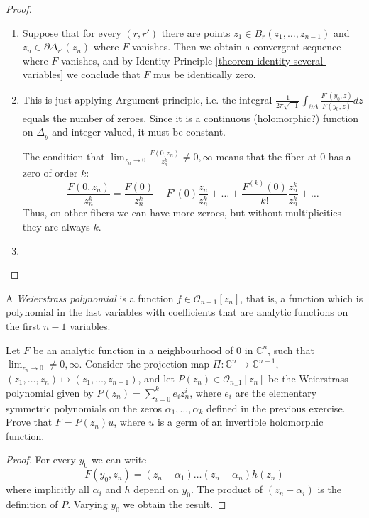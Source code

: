 \begin{proof}
\begin{enumerate}
\item Suppose that for every $(r,r')$ there are points 
$z_1\in B_r(z_1,\ldots,z_{n-1})$ and $z_n\in \partial\Delta_{r'}(z_n)$
where $F$ vanishes. Then we obtain a convergent sequence where $F$
vanishes, and by Identity Principle \ref{theorem-identity-several-variables} we
conclude that $F$ mus be identically zero.
\item This is just applying Argument principle, i.e. the integral 
$\frac{1}{2\pi\sqrt{-1}}\int_{\partial \Delta}\frac{F'(y_0,z)}{F(y_0,z)}dz$ 
equals the number of zeroes. Since it is a continuous (holomorphic?) function on
$\Delta_y$ and integer valued, it must be constant.

The condition that $\lim_{z_n\to0}\frac{F(0,z_n)}{z_n^k}\neq 0,\infty$ means
that the fiber at 0 has a zero of order $k$:
$$
\frac{F(0,z_n)}{z_n^k}=\frac{F(0)}{z_n^k}+F'(0)\frac{z_n}{z_n^k}+\ldots
+\frac{F^{(k)}(0)}{k!}\frac{z_n^k}{z_n^k}+\ldots
$$
Thus, on other fibers we can have
more zeroes, but without multiplicities they are always $k$.
\item 
\end{enumerate}
\end{proof}

\begin{definition}
\label{definition-weierstrass-polynomial}
A {\it Weierstrass polynomial} is a function $f \in \mathcal{O}_{n-1}[z_n]$,
that is, a function which is polynomial in the last variables with coefficients
that are analytic functions on the first $n-1$ variables.
\end{definition}

\begin{exercise}
\label{exercise-weierstrass-preparation-theorem}
Let $F$ be an analytic function in a neighbourhood of $0$ in $\mathbb{C}^n$,
such that $\lim_{z_n\to 0}\neq 0,\infty$. Consider the projection map
$\Pi:\mathbb{C}^n\to\mathbb{C}^{n-1}$, 
$(z_1,\ldots,z_n)\mapsto(z_1,\ldots,z_{n-1})$, and let 
$P(z_n)\in \mathcal{O}_{n_-1}[z_n]$ be the Weierstrass polynomial given by 
$P(z_n)=\sum_{i=0}^ke_iz_n^i$, where $e_i$ are the elementary symmetric
polynomials on the zeros $\alpha_1,\ldots,\alpha_k$ defined in the previous
exercise. Prove that $F=P(z_n)u$, where $u$ is a germ of an invertible
holomorphic function.
\end{exercise}

\begin{proof}
For every $y_0$ we can write
$$
F(y_0,z_n)=(z_n-\alpha_1)\ldots(z_n-\alpha_n)h(z_n)
$$
where implicitly all $\alpha_i$ and $h$ depend on $y_0$. The product of 
$(z_n-\alpha_i)$ is the definition of $P$. Varying $y_0$ we obtain the result.
\end{proof}

